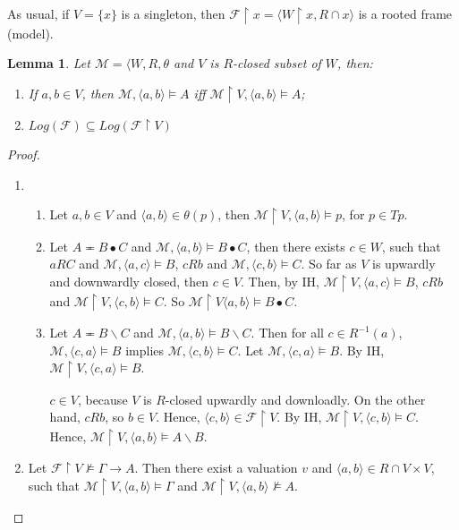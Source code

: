 \documentclass[a4paper]{article}
\theoremstyle{defin}
\theoremstyle{theorem}
\theoremstyle{prop}
\theoremstyle{lemma}
\newtheorem{lemma}{Lemma}
\theoremstyle{ex}
\theoremstyle{col}
\begin{document}
As usual, if $V = \{ x \}$ is a singleton, then $\mathcal{F} \restriction x = \langle W \restriction x, R \cap x \rangle$ is a rooted frame (model).  

\begin{lemma}
  Let $\mathcal{M} = \langle W, R, \theta$ and $V$ is $R$-closed subset of $W$, then:
  \begin{enumerate}
    \item If $a, b \in V$, then $\mathcal{M}, \langle a, b \rangle \models A$ iff $\mathcal{M} \restriction V, \langle a, b \rangle \models A$;
    \item $Log(\mathcal{F}) \subseteq Log(\mathcal{F} \restriction V)$
  \end{enumerate}
\end{lemma}

\begin{proof}
  $ $
  \begin{enumerate}
    \item
    \begin{enumerate}
      \item Let $a, b \in V$ and $\langle a, b \rangle \in \theta(p)$, then $\mathcal{M} \restriction V, \langle a, b \rangle \models p$, for $p \in Tp$.
      \item Let $A \eqcirc B \bullet C$ and $\mathcal{M}, \langle a, b \rangle \models B \bullet C$, then
      there exists $c \in W$, such that $a R C$ and $\mathcal{M}, \langle a, c \rangle \models B$, $c R b$ and $\mathcal{M}, \langle c, b \rangle \models C$.
      So far as $V$ is upwardly and downwardly closed, then $c \in V$. Then, by IH, $\mathcal{M} \restriction V , \langle a, c \rangle \models B$, $c R b$ and
      $\mathcal{M} \restriction V, \langle c, b \rangle \models C$. So $\mathcal{M} \restriction V \langle a, b \rangle \models B \bullet C$.
      \item Let $A \eqcirc B \backslash C$ and $\mathcal{M}, \langle a, b \rangle \models B \backslash C$. Then for all $c \in R^{-1}(a)$, $\mathcal{M},
      \langle c, a \rangle \models B$ implies $\mathcal{M}, \langle c, b \rangle \models C$. Let $\mathcal{M}, \langle c, a \rangle \models B$.
      By IH, $\mathcal{M} \restriction V, \langle c, a \rangle \models B$.

      $c \in V$, because $V$ is $R$-closed upwardly and downloadly. On the other hand, $c R b$, so $b \in V$. Hence,
      $\langle c, b \rangle \in \mathcal{F} \restriction V$. By IH, $\mathcal{M} \restriction V, \langle c, b \rangle \models C$. Hence,
      $\mathcal{M} \restriction V, \langle a, b \rangle \models A \backslash B$.
    \end{enumerate}
    \item Let $\mathcal{F} \restriction V\not\models \Gamma \to A$. Then there exist a valuation $v$ and $\langle a, b \rangle \in R \cap V \times V$,
    such that $\mathcal{M} \restriction V, \langle a,b \rangle \models \Gamma$ and $\mathcal{M} \restriction V, \langle a,b \rangle\not\models A$.


\end{enumerate}
\end{proof}
\end{document}
